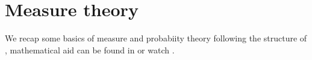 \documentclass[10pt,a4paper]{article}
\begin{document}
\section{Measure theory}
We recap some basics of measure and probabiity theory  following the structure of \cite{szepesvari2020bandit}, mathematical aid can be found in \cite{tao2011introduction} or watch \cite{brightsideofmaths}.

\end{document}
